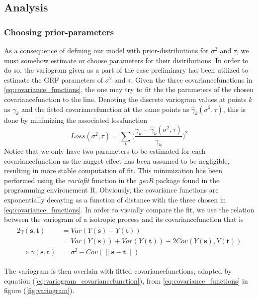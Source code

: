 \subsection{Analysis}
\subsubsection{Choosing prior-parameters}
As a consequence of defining our model with prior-distributions for $\sigma^2$ and $\tau$, we must somehow estimate or choose parameters for their distributions. In order to do so, the variogram given as a part of the case preliminary has been utilized to estimate the GRF parameters of $\sigma^2$ and $\tau$. Given the three covariancefunctions in \ref{eq:covariance_functions}, the one may try to fit the the parameters of the chosen covariancefunction to the line. Denoting the discrete variogram values at points $k$ as $\gamma_k$ and the fitted covariancefunction at the same points as $\hat{\gamma}_k(\sigma^2, \tau)$, this is done by minimizing the associated lossfunction
\begin{equation} \label{eq:loss_function}
Loss(\sigma^2, \tau) = \sum_k \bigg( \frac{\gamma_k - \hat{\gamma}_k(\sigma^2, \tau)}{\gamma_k} \bigg)^2
\end{equation}
Notice that we only have two parameters to be estimated for each covariancefunction as the nugget effect has been assumed to be negligible, resulting in more stable computation of fit. This minimization has been performed using the \textit{variofit} function in the \textit{geoR} package found in the programming environement R. Obviously, the covariance functions are exponentially decaying as a function of distance with the three chosen in \ref{eq:covariance_functions}. In order to visually compare the fit, we use the relation between the variogram of a isotropic process and its covariancefunction that is
\begin{align} \label{eq:variogram_covariancefunction}
\begin{split}
    2\gamma(\textbf{s},\textbf{t}) &= Var(Y(\textbf{s}) - Y(\textbf{t})) \\
    &= Var(Y(\textbf{s})) + Var(Y(\textbf{t})) - 2Cov(Y(\textbf{s}),Y(\textbf{t})) \\
    \implies \gamma(\textbf{s},\textbf{t}) &= \sigma^2 - Cov(\|\textbf{s}-\textbf{t}\|)
\end{split}
\end{align}

The variogram is then overlain with fitted covariancefunctions, adapted by equation (\ref{eq:variogram_covariancefunction}), from \ref{eq:covariance_functions} in figure (\ref{fig:variogram}).  

